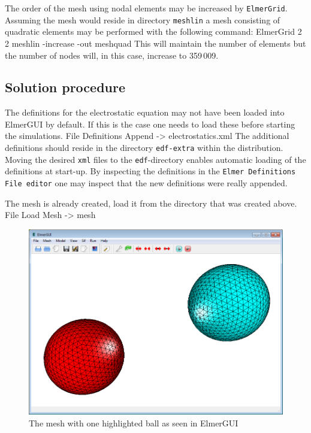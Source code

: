 The order of the mesh using nodal elements 
may be increased by \texttt{ElmerGrid}. Assuming the mesh would reside in directory \texttt{meshlin}
a mesh consisting of quadratic elements may be performed with the following command:
\ttbegin
ElmerGrid 2 2 meshlin -increase -out meshquad
\ttend
This will maintain the number of elements but the number of nodes will, in this case, increase to 359\,009. 


\subsection*{Solution procedure}

The definitions for the electrostatic equation may not have been loaded into ElmerGUI by default. If this is the case 
one needs to load these before starting the simulations.
\ttbegin
File 
  Definitions
    Append -> electrostatics.xml
\ttend
The additional definitions should reside in the directory \texttt{edf-extra} within the distribution.
Moving the desired \texttt{xml} files to the \texttt{edf}-directory enables automatic loading of the 
definitions at start-up. By inspecting the definitions in the \texttt{Elmer Definitions File editor} one
may inspect that the new definitions were really appended. 


The mesh is already created, load it from the directory that was created above.
\ttbegin
File 
  Load Mesh -> mesh
\ttend

\begin{figure}[h]
\centering
\includegraphics[width=140mm]{ElmerGUI_capture}
\caption{The mesh with one highlighted ball as seen in ElmerGUI}\label{fg:ballselmergui}
\end{figure}  


